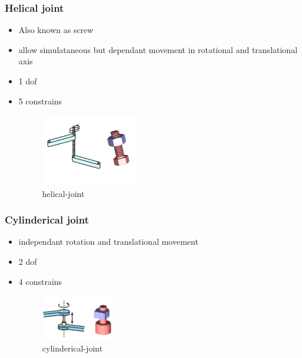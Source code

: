 \documentclass{article}
\begin{document}
\subsubsection{Helical joint }
\begin{itemize}
	\item Also known as screw
	\item allow simulataneous but dependant movement in rotational and translational axis
	\item 1 dof
	\item 5 constrains
	      \begin{figure}[htpb]
		      \centering
		      \includegraphics[width=0.4\textwidth]{helical-joint}
		      \caption{helical-joint}
		      \label{fig:helical-joint}
	      \end{figure}
\end{itemize}
\subsubsection{Cylinderical joint}
\begin{itemize}
	\item independant rotation and translational movement
	\item 2 dof
	\item 4 constrains
	      \begin{figure}[htpb]
		      \centering
		      \includegraphics[width=0.3\textwidth]{cylinderical-joint}
		      \caption{cylinderical-joint}
		      \label{fig:cylinderical-joint}
	      \end{figure}
\end{itemize}
\newpage
\end{document}
